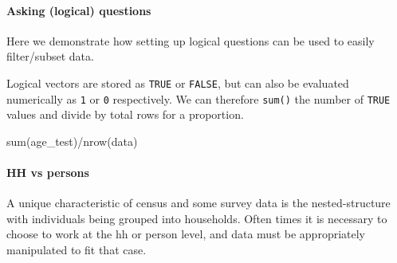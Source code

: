 \documentclass[
]{book}
\newenvironment{Shaded}{\begin{snugshade}}{\end{snugshade}}
\newcommand{\DecValTok}[1]{\textcolor[rgb]{0.00,0.00,0.81}{#1}}
\newcommand{\FunctionTok}[1]{\textcolor[rgb]{0.00,0.00,0.00}{#1}}
\newcommand{\NormalTok}[1]{#1}
\newcommand{\OtherTok}[1]{\textcolor[rgb]{0.56,0.35,0.01}{#1}}
\newcommand{\SpecialCharTok}[1]{\textcolor[rgb]{0.00,0.00,0.00}{#1}}
\begin{document}
\hypertarget{asking-logical-questions}{%
\paragraph{Asking (logical) questions}\label{asking-logical-questions}}

Here we demonstrate how setting up logical questions can be used to easily filter/subset data.

\begin{Shaded}
\end{Shaded}

Logical vectors are stored as \texttt{TRUE} or \texttt{FALSE}, but can also be evaluated numerically as \texttt{1} or \texttt{0} respectively. We can therefore \texttt{sum()} the number of \texttt{TRUE} values and divide by total rows for a proportion.

\begin{Shaded}
\begin{Highlighting}[]
\FunctionTok{sum}\NormalTok{(age\_test)}\SpecialCharTok{/}\FunctionTok{nrow}\NormalTok{(data)}
\end{Highlighting}
\end{Shaded}

\hypertarget{hh-vs-persons}{%
\paragraph{HH vs persons}\label{hh-vs-persons}}

A unique characteristic of census and some survey data is the nested-structure with individuals being grouped into households. Often times it is necessary to choose to work at the hh or person level, and data must be appropriately manipulated to fit that case.

\begin{Shaded}
\end{Shaded}
\end{document}
